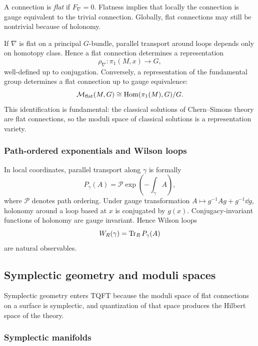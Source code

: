 A connection is \emph{flat} if $F_\nabla=0$. Flatness implies that locally the connection is gauge equivalent to the trivial connection. Globally, flat connections may still be nontrivial because of holonomy.

If $\nabla$ is flat on a principal $G$-bundle, parallel transport around loops depends only on homotopy class. Hence a flat connection determines a representation
\begin{equation}
  \rho_\nabla : \pi_1(M,x) \to G,
\end{equation}
well-defined up to conjugation. Conversely, a representation of the fundamental group determines a flat connection up to gauge equivalence:
\begin{equation}
  \mathcal{M}_{\mathrm{flat}}(M,G)
  \cong
  \operatorname{Hom}(\pi_1(M),G)/G.
\end{equation}
This identification is fundamental: the classical solutions of Chern--Simons theory are flat connections, so the moduli space of classical solutions is a representation variety.

\subsubsection{Path-ordered exponentials and Wilson loops}

In local coordinates, parallel transport along $\gamma$ is formally
\begin{equation}
  P_\gamma(A)=\mathcal{P}\exp\left(-\int_\gamma A\right),
\end{equation}
where $\mathcal{P}$ denotes path ordering. Under gauge transformation $A \mapsto g^{-1}Ag+g^{-1}\dd g$, holonomy around a loop based at $x$ is conjugated by $g(x)$. Conjugacy-invariant functions of holonomy are gauge invariant. Hence Wilson loops
\begin{equation}
  W_R(\gamma)=\operatorname{Tr}_R P_\gamma(A)
\end{equation}
are natural observables.

\subsection{Symplectic geometry and moduli spaces}

Symplectic geometry enters TQFT because the moduli space of flat connections on a surface is symplectic, and quantization of that space produces the Hilbert space of the theory.

\subsubsection{Symplectic manifolds}

